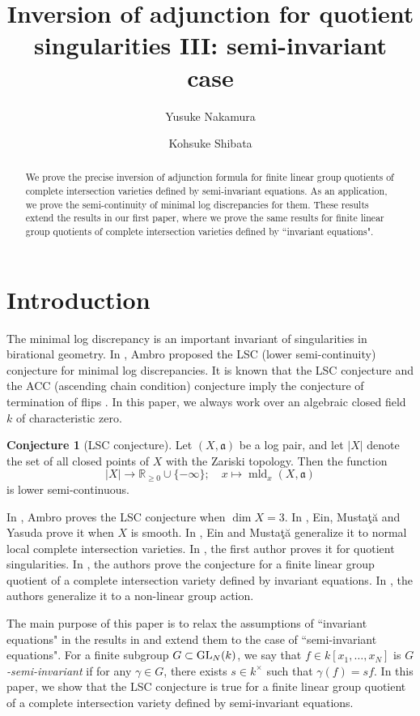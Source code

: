 \documentclass[a4paper,11pt]{amsart}
\title[Inversion of adjunction for quotient singularities III]
{Inversion of adjunction for quotient singularities III: semi-invariant case}
\author{Yusuke Nakamura}
\author{Kohsuke Shibata}
\theoremstyle{definition}
\newtheorem{conj}[thm]{Conjecture}
\theoremstyle{remark}
\begin{document}
\maketitle


\begin{abstract}
We prove the precise inversion of adjunction formula for finite linear group quotients of complete intersection varieties defined by semi-invariant equations. 
As an application, we prove the semi-continuity of minimal log discrepancies for them. 
These results extend the results in our first paper, where we prove the same results for finite linear group quotients of complete intersection varieties defined by ``invariant equations". 
\end{abstract}

\section{Introduction}
The minimal log discrepancy is an important invariant of singularities in birational geometry.
In \cite{Amb99}, Ambro proposed the LSC (lower semi-continuity) conjecture for minimal log discrepancies.
It is known that the LSC conjecture and the ACC (ascending chain condition) conjecture imply the conjecture of termination of flips \cite{Sho04}.
In this paper, we always work over an algebraic closed field $k$ of characteristic zero. 

\begin{conj}[LSC conjecture]\label{conj:LSC}
Let $(X, \mathfrak{a})$ be a log pair, and let $|X|$ denote the set of all closed points of $X$ with the Zariski topology. 
Then the function 
\[
|X| \to \mathbb{R}_{\ge 0} \cup \{ - \infty \}; \quad x \mapsto \operatorname{mld}_x (X,\mathfrak{a})
\]
is lower semi-continuous. 
\end{conj}

In \cite{Amb99}, Ambro proves the LSC conjecture when $\dim X = 3$.
In \cite{EMY03}, Ein, Musta\c{t}\u{a} and Yasuda prove it when $X$ is smooth. In \cite{EM04}, Ein and Musta\c{t}\u{a} generalize it to normal local complete intersection varieties. 
In \cite{Nak16}, the first author proves it for quotient singularities.
In \cite{NS22}, the authors prove the conjecture for a finite linear group quotient of a complete intersection variety defined by invariant equations.
In \cite{NS2}, the authors generalize it to a non-linear group action.

The main purpose of this paper is to relax the assumptions of ``invariant equations" in the results in \cite{NS22} and extend them to the case of ``semi-invariant equations". 
For a finite subgroup $G\subset {\rm GL}_N(k)$, we say that $f \in k[x_1, \ldots , x_N]$ is \textit{$G$-semi-invariant} if for any $\gamma \in G$, there exists $s \in k^{\times}$ such that $\gamma (f) = s f$.
In this paper, we show that the LSC conjecture is true for a finite linear group quotient of a complete intersection variety defined by semi-invariant equations. 
\end{document}

